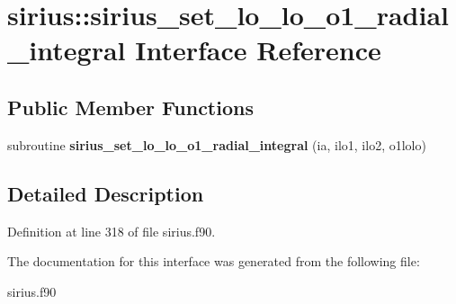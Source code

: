 \hypertarget{interfacesirius_1_1sirius__set__lo__lo__o1__radial__integral}{}\section{sirius\+:\+:sirius\+\_\+set\+\_\+lo\+\_\+lo\+\_\+o1\+\_\+radial\+\_\+integral Interface Reference}
\label{interfacesirius_1_1sirius__set__lo__lo__o1__radial__integral}
\subsection*{Public Member Functions}
\begin{DoxyCompactItemize}
\item 
\hypertarget{interfacesirius_1_1sirius__set__lo__lo__o1__radial__integral_af8c9888029a907ee0d03554967511425}{}subroutine {\bfseries sirius\+\_\+set\+\_\+lo\+\_\+lo\+\_\+o1\+\_\+radial\+\_\+integral} (ia, ilo1, ilo2, o1lolo)\label{interfacesirius_1_1sirius__set__lo__lo__o1__radial__integral_af8c9888029a907ee0d03554967511425}

\end{DoxyCompactItemize}


\subsection{Detailed Description}


Definition at line 318 of file sirius.\+f90.



The documentation for this interface was generated from the following file\+:\begin{DoxyCompactItemize}
\item 
sirius.\+f90\end{DoxyCompactItemize}
